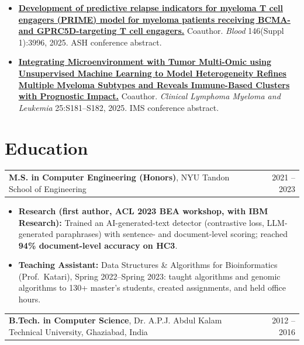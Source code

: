 \documentclass[letterpaper,11pt]{article}
\newenvironment{bullets}{\begin{itemize}[leftmargin=12pt,itemsep=2pt,parsep=0pt,topsep=1.5pt]}{\end{itemize}\vspace{3pt}}
\newcommand{\lead}[1]{\textbf{#1}}
\begin{document}
\begin{small}
\begin{bullets}
  \item \href{https://doi.org/10.1182/blood-2025-3996}{\textbf{Development of predictive relapse indicators for myeloma T cell engagers (PRIME) model for myeloma patients receiving BCMA- and GPRC5D-targeting T cell engagers.}}
  Coauthor. \textit{Blood} 146(Suppl 1):3996, 2025. ASH conference abstract.
  \item \href{https://doi.org/10.1016/s2152-2650(25)03699-7}{\textbf{Integrating Microenvironment with Tumor Multi-Omic using Unsupervised Machine Learning to Model Heterogeneity Refines Multiple Myeloma Subtypes and Reveals Immune-Based Clusters with Prognostic Impact.}}
  Coauthor. \textit{Clinical Lymphoma Myeloma and Leukemia} 25:S181--S182, 2025. IMS conference abstract.
\end{bullets}\end{small}


\section{Education}
\begin{tabularx}{\textwidth}{@{}X r@{}}
  \textbf{M.S. in Computer Engineering (Honors)}, NYU Tandon School of Engineering & 2021 -- 2023 \\
\end{tabularx}
\begin{bullets}
  \item \lead{Research (first author, ACL 2023 BEA workshop, with IBM Research):} Trained an AI-generated-text detector (contrastive loss,
        LLM-generated paraphrases) with sentence- and document-level scoring; reached \textbf{94\% document-level accuracy on HC3}.
  \item \lead{Teaching Assistant:} Data Structures \& Algorithms for Bioinformatics (Prof.\ Katari), Spring 2022--Spring 2023: taught
        algorithms and genomic algorithms to 130+ master's students, created assignments, and held office hours.

\end{bullets}
\begin{tabularx}{\textwidth}{@{}X r@{}}
  \textbf{B.Tech. in Computer Science}, Dr. A.P.J. Abdul Kalam Technical University, Ghaziabad, India & 2012 -- 2016 \\
\end{tabularx}
\end{document}
